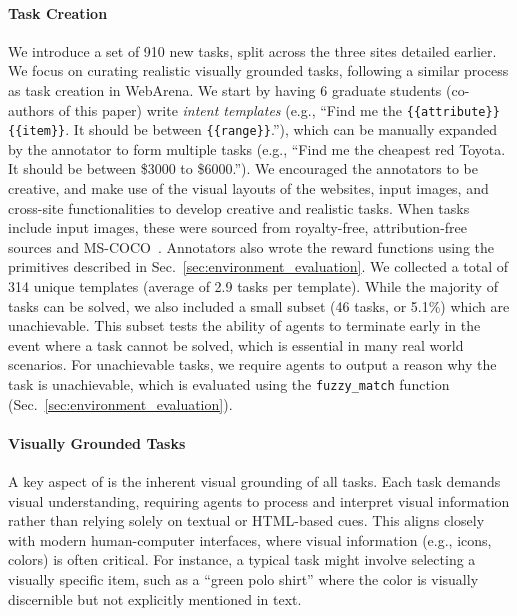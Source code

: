 \paragraph{Task Creation} We introduce a set of 910 new tasks, split across the three sites detailed earlier. %
We focus on curating realistic visually grounded tasks, following a similar process as task creation in WebArena. We start by having 6 graduate students (co-authors of this paper) write \textit{intent templates} (e.g., ``Find me the \texttt{\{\{attribute\}\}} \texttt{\{\{item\}\}}. It should be between \texttt{\{\{range\}\}}.''), which can be manually expanded by the annotator to form multiple tasks (e.g., ``Find me the cheapest red Toyota. It should be between \$3000 to \$6000.''). %
We encouraged the annotators to be creative, and make use of the visual layouts of the websites, input images, and cross-site functionalities to develop creative and realistic tasks. When tasks include input images, these were sourced from royalty-free, attribution-free sources and MS-COCO~\citep{lin2014microsoft}. Annotators also wrote the reward functions using the primitives described in Sec.~\ref{sec:environment_evaluation}. We collected a total of 314 unique templates (average of 2.9 tasks per template). 
While the majority of tasks can be solved, we also included a small subset (46 tasks, or 5.1\%) which are unachievable. This subset tests the ability of agents to terminate early in the event where a task cannot be solved, which is essential in many real world scenarios. For unachievable tasks, we require agents to output a reason why the task is unachievable, which is evaluated using the \texttt{fuzzy\_match} function (Sec.~\ref{sec:environment_evaluation}).


\paragraph{Visually Grounded Tasks} A key aspect of \BenchmarkName{} is the inherent visual grounding of all tasks. Each task demands visual understanding, requiring agents to process and interpret visual information rather than relying solely on textual or HTML-based cues. This aligns closely with modern human-computer interfaces, where visual information (e.g., icons, colors) is often critical. For instance, a typical task might involve selecting a visually specific item, such as a ``green polo shirt'' where the color is visually discernible but not explicitly mentioned in text.


